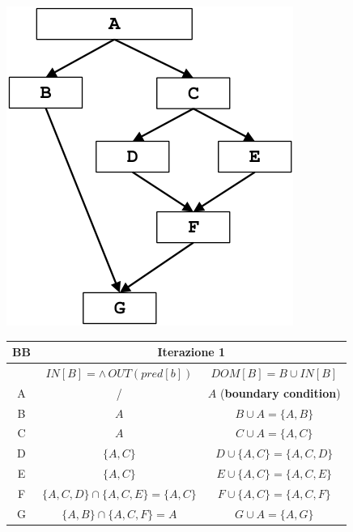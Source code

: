 \documentclass[10pt,a4paper]{article}
\begin{document}
\noindent\begin{minipage}[c]{.4\textwidth}
  \includegraphics[width=.7\textwidth]{example-2.png}
\end{minipage}
\begin{minipage}[c]{.5\textwidth}
\centering
\renewcommand{\arraystretch}{1.5}
\begin{tabular}{|c|c|c|}
\hline
\rowcolor{blue!30}
BB & \multicolumn{2}{c|}{Iterazione 1} \\
\hline
\rowcolor{blue!30}
   & $IN[B] = \wedge\, OUT(pred[b])$ & $DOM[B]= B \cup IN[B]$ \\
\hline
A & /  & $A$ (\textbf{boundary condition})\\
\hline
B & $A$ & $B \cup A=\lbrace A,B \rbrace$ \\
\hline
C & $A$ & $C \cup A = \lbrace A,C \rbrace$ \\
\hline
D & $\lbrace A,C \rbrace$ & $D \cup \lbrace A,C \rbrace = \lbrace A,C,D \rbrace$ \\
\hline
E & $\lbrace A,C \rbrace$ & $E \cup \lbrace A,C \rbrace = \lbrace A,C,E \rbrace$ \\
\hline
F & $\lbrace A,C,D\rbrace\cap \lbrace A,C,E\rbrace = \lbrace A,C \rbrace$ & $F \cup \lbrace A,C\rbrace = \lbrace A,C,F\rbrace$ \\
\hline
G & $\lbrace A,B \rbrace \cap \lbrace A,C,F\rbrace = A$ & $G \cup A = \lbrace A,G \rbrace$ \\
\hline
\end{tabular}
\end{minipage}
\end{document}
